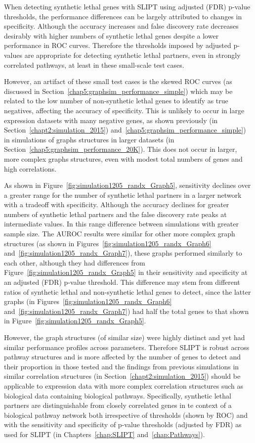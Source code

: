 When detecting synthetic lethal genes with \gls{SLIPT} using adjusted (FDR) p-value thresholds, the performance differences can be largely attributed to changes in specificity. Although the accuracy increases and false discovery rate decreases desirably with higher numbers of synthetic lethal  genes despite a lower performance in \gls{ROC} curves. Therefore the thresholds imposed by adjusted p-values are appropriate for detecting synthetic lethal partners, even in strongly correlated pathways, at least in these small-scale test cases.

However, an artifact of these small test cases is the skewed \gls{ROC} curves (as discussed in Section~\ref{chap5:graphsim_performance_simple}) which may be related to the low number of non-synthetic lethal genes to identify as true negatives, affecting the accuracy of specificity. This is unlikely to occur in large expression datasets with many negative genes, as shown previously (in Section~\ref{chapt2:simulation_2015}) and~\ref{chap5:graphsim_performance_simple}) in simulations of graphs structures in larger datasets (in Section~\ref{chap5:graphsim_performance_20K}). This does not occur in larger, more complex graphs structures, even with modest total numbers of genes and high correlations.

As shown in Figure~\ref{fig:simulation1205_randx_Graph5}, sensitivity declines over a greater range for the number of synthetic lethal partners in a larger network with a tradeoff with specificity. Although the accuracy declines for greater numbers of synthetic lethal partners and the false discovery rate peaks at intermediate values. In this range difference between simulations with greater sample size. The \gls{AUROC} results were similar for other more complex graph structures (as shown in Figures~\ref{fig:simulation1205_randx_Graph6} and~\ref{fig:simulation1205_randx_Graph7}), these graphs performed similarly to each other, although they had differences from Figure~\ref{fig:simulation1205_randx_Graph5} in their sensitivity and specificity at an adjusted (FDR) p-value threshold. This difference may stem from different ratios of synthetic lethal and non-synthetic lethal genes to detect, since the latter graphs (in Figures~\ref{fig:simulation1205_randx_Graph6} and~\ref{fig:simulation1205_randx_Graph7}) had half the total genes to that shown in Figure~\ref{fig:simulation1205_randx_Graph5}.

However, the graph structures (of similar size) were highly distinct and yet had similar performance profiles across parameters. Therefore \gls{SLIPT} is robust across pathway structures and is more affected by the number of genes to detect and their proportion in those tested and the findings from previous simulations in similar correlation structures (in Section~\ref{chapt2:simulation_2015}) should be applicable to expression data with more complex correlation structures such as biological data containing biological pathways. Specifically, synthetic lethal partners are distinguishable from closely correlated genes in te context of a biological pathway network both irrespective of thresholds (shown by \gls{ROC}) and with the sensitivity and specificity of p-value thresholds (adjusted by FDR) as used for \gls{SLIPT} (in Chapters~\ref{chap:SLIPT} and~\ref{chap:Pathways}).


